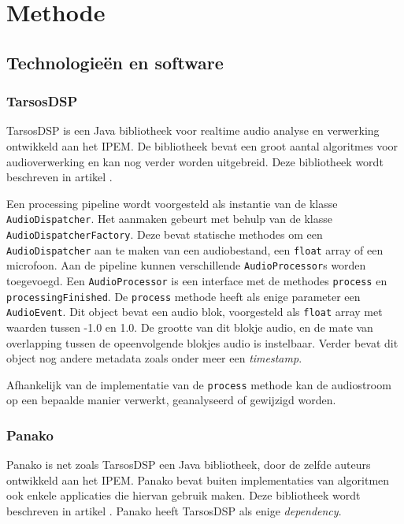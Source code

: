 \chapter{Methode}

\section{Technologieën en software}

\subsection{TarsosDSP}

TarsosDSP is een Java bibliotheek voor realtime audio analyse en verwerking ontwikkeld aan het IPEM. De bibliotheek bevat een groot aantal algoritmes voor audioverwerking en kan nog verder worden uitgebreid. Deze bibliotheek wordt beschreven in artikel \cite{six2014tarsosdsp}. 

Een processing pipeline wordt voorgesteld als instantie van de klasse \texttt{AudioDispatcher}. Het aanmaken gebeurt met behulp van de klasse \texttt{AudioDispatcherFactory}. Deze bevat statische methodes om een \texttt{AudioDispatcher} aan te maken van een audiobestand, een \texttt{float} array of een microfoon. Aan de pipeline kunnen verschillende \texttt{AudioProcessor}s worden toegevoegd. Een \texttt{AudioProcessor} is een interface met de methodes \texttt{process} en \texttt{processingFinished}. De \texttt{process} methode heeft als enige parameter een \texttt{AudioEvent}. Dit object bevat een audio blok, voorgesteld als \texttt{float} array met waarden tussen -1.0 en 1.0. De grootte van dit blokje audio, en de mate van overlapping tussen de opeenvolgende blokjes audio is instelbaar. Verder bevat dit object nog andere metadata zoals onder meer een \textit{timestamp}.

Afhankelijk van de implementatie van de \texttt{process} methode kan de audiostroom op een bepaalde manier verwerkt, geanalyseerd of gewijzigd worden.

\subsection{Panako}

Panako is net zoals TarsosDSP een Java bibliotheek, door de zelfde auteurs ontwikkeld aan het IPEM. Panako bevat buiten implementaties van algoritmen ook enkele applicaties die hiervan gebruik maken.  Deze bibliotheek wordt beschreven in artikel \cite{six2014panako}. Panako heeft TarsosDSP als enige \textit{dependency}.

